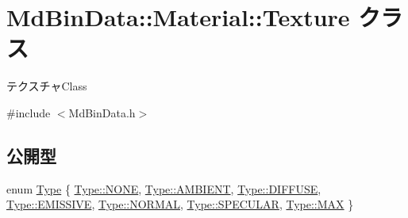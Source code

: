 \hypertarget{class_md_bin_data_1_1_material_1_1_texture}{}\section{Md\+Bin\+Data\+:\+:Material\+:\+:Texture クラス}
\label{class_md_bin_data_1_1_material_1_1_texture}


テクスチャ\+Class  




{\ttfamily \#include $<$Md\+Bin\+Data.\+h$>$}

\subsection*{公開型}
\begin{DoxyCompactItemize}
\item 
enum \mbox{\hyperlink{class_md_bin_data_1_1_material_1_1_texture_a30fadb7216d0650de284e2fd875868ae}{Type}} \{ \newline
\mbox{\hyperlink{class_md_bin_data_1_1_material_1_1_texture_a30fadb7216d0650de284e2fd875868aeab50339a10e1de285ac99d4c3990b8693}{Type\+::\+N\+O\+NE}}, 
\mbox{\hyperlink{class_md_bin_data_1_1_material_1_1_texture_a30fadb7216d0650de284e2fd875868aeae2efd91581bab719d6c67ea43d1afd9b}{Type\+::\+A\+M\+B\+I\+E\+NT}}, 
\mbox{\hyperlink{class_md_bin_data_1_1_material_1_1_texture_a30fadb7216d0650de284e2fd875868aea84a9d8c4d046cae1f87af62f45f07e68}{Type\+::\+D\+I\+F\+F\+U\+SE}}, 
\mbox{\hyperlink{class_md_bin_data_1_1_material_1_1_texture_a30fadb7216d0650de284e2fd875868aea91520e2b2b496ddf92e7ed320df5027b}{Type\+::\+E\+M\+I\+S\+S\+I\+VE}}, 
\newline
\mbox{\hyperlink{class_md_bin_data_1_1_material_1_1_texture_a30fadb7216d0650de284e2fd875868aea1e23852820b9154316c7c06e2b7ba051}{Type\+::\+N\+O\+R\+M\+AL}}, 
\mbox{\hyperlink{class_md_bin_data_1_1_material_1_1_texture_a30fadb7216d0650de284e2fd875868aea0df54c320628149300093da5e2ff693d}{Type\+::\+S\+P\+E\+C\+U\+L\+AR}}, 
\mbox{\hyperlink{class_md_bin_data_1_1_material_1_1_texture_a30fadb7216d0650de284e2fd875868aea26a4b44a837bf97b972628509912b4a5}{Type\+::\+M\+AX}}
 \}
\end{DoxyCompactItemize}
